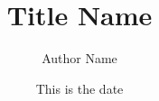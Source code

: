 \documentclass[12pt]{extarticle}
\title{\textbf{Title Name}}
\author{Author Name}
\date{This is the date}
\begin{document}

\maketitle{}

\end{document}
